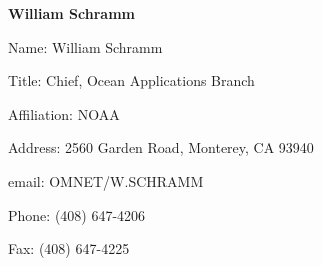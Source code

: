 \begin{center}
\LARGE
{\bf  William Schramm}
\end{center}
\large
{}
\normalsize
\smallskip
\begin{description}
\item{Name:} William Schramm
\item{Title:}  Chief, Ocean Applications Branch
\item{Affiliation:}  NOAA
\item{Address:}  2560 Garden Road, Monterey, CA 93940
\item{email:}  OMNET/W.SCHRAMM
\item{Phone:}  (408) 647-4206
\item{Fax:}  (408) 647-4225
\end{description}
\medskip
\large
{}
\normalsize
\medskip
